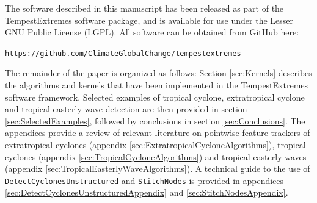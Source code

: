 \documentclass[gmdd, hvmath, online]{copernicus_discussions}
\begin{document}
The software described in this manuscript has been released as part of the TempestExtremes software package, and is available for use under the Lesser GNU Public License (LGPL).  All software can be obtained from GitHub here:
\begin{center}
\texttt{https://github.com/ClimateGlobalChange/tempestextremes}
\end{center} 

The remainder of the paper is organized as follows:  Section \ref{sec:Kernels} describes the algorithms and kernels that have been implemented in the TempestExtremes software framework.  Selected examples of tropical cyclone, extratropical cyclone and tropical easterly wave detection are then provided in section \ref{sec:SelectedExamples}, followed by conclusions in section \ref{sec:Conclusions}.  The appendices provide a review of relevant literature on pointwise feature trackers of extratropical cyclones (appendix \ref{sec:ExtratropicalCycloneAlgorithms}), tropical cyclones (appendix \ref{sec:TropicalCycloneAlgorithms}) and tropical easterly waves (appendix \ref{sec:TropicalEasterlyWaveAlgorithms}).  A technical guide to the use of \texttt{DetectCyclonesUnstructured} and \texttt{StitchNodes} is provided in appendices \ref{sec:DetectCyclonesUnstructuredAppendix} and \ref{sec:StitchNodesAppendix}.





\end{document}
